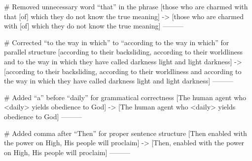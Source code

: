 # Removed unnecessary word “that” in the phrase
[those who are charmed with that [of] which they do not know the true meaning]
->
[those who are charmed with [of] which they do not know the true meaning]
---------

# Corrected “to the way in which” to “according to the way in which” for parallel structure
[according to their backsliding, according to their worldliness and to the way in which they have called darkness light and light darkness]
->
[according to their backsliding, according to their worldliness and according to the way in which they have called darkness light and light darkness]
---------

# Added “a” before “daily” for grammatical correctness
[The human agent who <daily> yields obedience to God]
->
[The human agent who <daily> yields obedience to God]
---------

# Added comma after “Then” for proper sentence structure
[Then enabled with the power on High, His people will proclaim]
->
[Then, enabled with the power on High, His people will proclaim]
---------